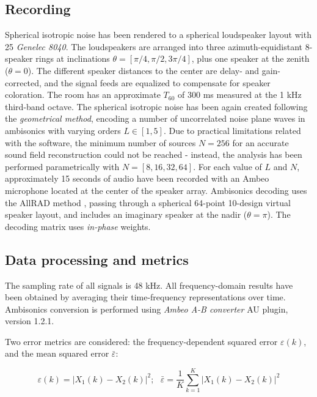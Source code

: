 \subsection{Recording}
Spherical isotropic noise has been rendered to a spherical loudspeaker layout with 25 \textit{Genelec 8040}. The loudspeakers are arranged into three azimuth-equidistant 8-speaker rings at inclinations $\theta = [\pi/4, \pi/2, 3\pi/4]$, plus one speaker at the zenith ($\theta=0$).
The different speaker distances to the center are delay- and gain-corrected, and the signal feeds are equalized to compensate for speaker coloration. The room has an approximate $T_{60}$ of 300 ms measured at the 1 kHz third-band octave. 
The spherical isotropic noise has been again created following the \textit{geometrical method}, encoding a number of uncorrelated noise plane waves in ambisonics with varying orders $L \in [1,5]$. Due to practical limitations related with the software, the minimum number of sources $N = 256$ for an accurate sound field reconstruction \cite{habets_comments_2010} could not be reached - instead, the analysis has been performed parametrically with $N = [8, 16, 32, 64]$.
For each value of $L$ and $N$, approximately 15 seconds of audio have been recorded with an Ambeo microphone located at the center of the speaker array.
Ambisonics decoding uses the AllRAD method \cite{zotter_all-round_2012}, passing through a spherical 64-point 10-design virtual speaker layout, and includes an imaginary speaker at the nadir ($\theta=\pi$). The decoding matrix uses \textit{in-phase} weights.



\subsection{Data processing and metrics}

The sampling rate of all signals is 48 kHz.
All frequency-domain results have been obtained by averaging their time-frequency representations over time.  
Ambisonics conversion is performed using \textit{Ambeo A-B converter} AU plugin, version 1.2.1.

Two error metrics are considered: the frequency-dependent squared error $\varepsilon(k)$, and the mean squared error $\bar{\varepsilon}$:

\begin{equation}
    \varepsilon(k) = |X_1(k) - X_2(k)|^2; \text{         }\bar{\varepsilon} = \frac{1}{K}{\sum_{k=1}^{K} |X_1(k) - X_2(k)|^2}
    \label{nmse}
\end{equation}



